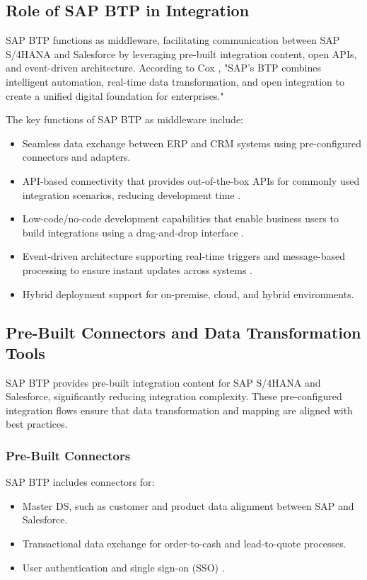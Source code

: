 \subsection{Role of SAP BTP in Integration}

SAP BTP functions as middleware, facilitating communication between SAP S/4HANA and Salesforce by leveraging pre-built integration content, open APIs, and event-driven architecture. According to Cox \cite{sap2020}, "SAP's BTP combines intelligent automation, real-time data transformation, and open integration to create a unified digital foundation for enterprises."

The key functions of SAP BTP as middleware include:
\begin{itemize}
\item Seamless data exchange between ERP and CRM systems using pre-configured connectors and adapters.
\item API-based connectivity that provides out-of-the-box APIs for commonly used integration scenarios, reducing development time \cite{sap2020}.
\item Low-code/no-code development capabilities that enable business users to build integrations using a drag-and-drop interface \cite{sap2020}.
\item Event-driven architecture supporting real-time triggers and message-based processing to ensure instant updates across systems \cite{kunchala2024}.
\item Hybrid deployment support for on-premise, cloud, and hybrid environments.
\end{itemize}

\subsection{Pre-Built Connectors and Data Transformation Tools}

SAP BTP provides pre-built integration content for SAP S/4HANA and Salesforce, significantly reducing integration complexity. These pre-configured integration flows ensure that data transformation and mapping are aligned with best practices.

\subsubsection{Pre-Built Connectors}
SAP BTP includes connectors for:
\begin{itemize}
\item Master DS, such as customer and product data alignment between SAP and Salesforce.
\item Transactional data exchange for order-to-cash and lead-to-quote processes.
\item User authentication and single sign-on (SSO) \cite{sap2020}.
\end{itemize}

